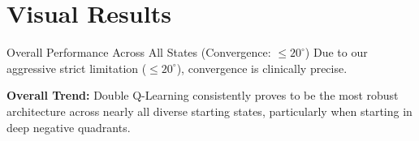 \documentclass[10pt, aspectratio=169]{beamer}
\begin{document}
\section{Visual Results}
\begin{frame}{Overall Performance Across All States (Convergence: $\leq 20^\circ$)}
    Due to our aggressive strict limitation ($\leq 20^\circ$), convergence is clinically precise.
    
    \begin{table}[]
        \centering
        \caption{Success Rate out of 32 Subjects (With Reward Shaping $\lambda=-100$)}
    \end{table}
    \textbf{Overall Trend:} Double Q-Learning consistently proves to be the most robust architecture across nearly all diverse starting states, particularly when starting in deep negative quadrants.
\end{frame}
\end{document}
